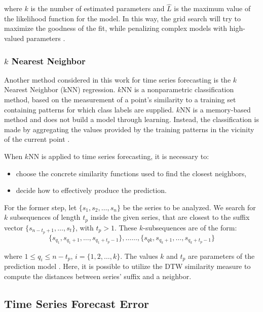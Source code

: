 where $k$ is the number of estimated parameters and $\hat{L}$ is the maximum value of the likelihood function for the model. In this way, the grid search will try to maximize the goodness of the fit, while penalizing complex models with high-valued parameters \cite{Hyndman2018}.

\subsubsection{$k$ Nearest Neighbor}
\label{Sec:TheorykNN}

Another method considered in this work for time series forecasting is the $k$ Nearest Neighbor (kNN) regression. $k$NN is a nonparametric classification method, based on the measurement of a point's similarity to a training set containing patterns for which class labels are supplied. $k$NN is a memory-based method and does not build a model through learning. Instead, the classification is made by aggregating the values provided by the training patterns in the vicinity of the current point \cite{Altman1992}. 

When $k$NN is applied to time series forecasting, it is necessary to:
\begin{itemize}
    \item choose the concrete similarity functions used to find the closest neighbors,
    \item decide how to effectively produce the prediction.
\end{itemize}
For the former step, let $\{s_{1}, s_{2}, \ldots, s_{n}\}$ be the series to be analyzed. We search for $k$ subsequences of length $t_p$ inside the given series, that are closest to the suffix vector $\{s_{n-t_{p}+1},\ldots, s_{t}\}$, with $t_{p} >1$. These $k$-subsequences are of the form: 
\begin{equation*}
    \{s_{q_{1}}, s_{q_{1}+1}, \ldots, s_{q_{1}+t_{p}-1} \}, \ldots \ldots, \{s_{q{k}}, s_{q_{k}+1}, \ldots, s_{q_{k} + t_{p} -1} \}
\end{equation*}

where $1 \leq q_{i} \leq n - t_{p}$, $i = \{1, 2, \ldots, k\}$. The values $k$ and $t_{p}$ are parameters of the prediction model \cite{Ban2013}. Here, it is possible to utilize the DTW similarity measure to compute the distances between series' suffix and a neighbor.

\subsection{Time Series Forecast Error}
\label{Sec:ErrorTSA}

